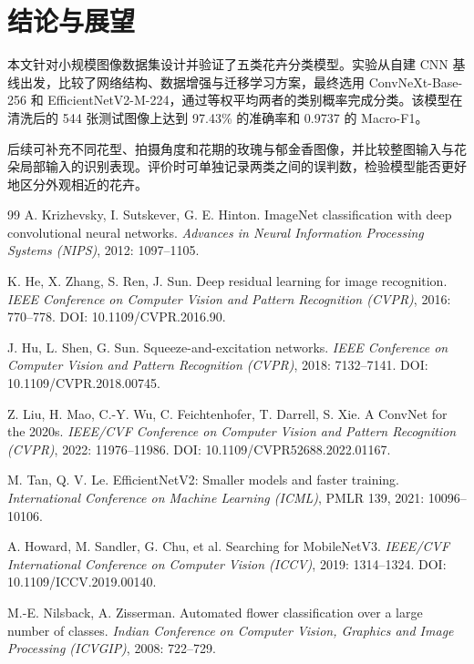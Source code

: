 \documentclass[11pt,a4paper,UTF8,fontset=windows]{ctexart}
\begin{document}
\section{结论与展望}

本文针对小规模图像数据集设计并验证了五类花卉分类模型。实验从自建 CNN 基线出发，比较了网络结构、数据增强与迁移学习方案，最终选用 ConvNeXt-Base-256 和 EfficientNetV2-M-224，通过等权平均两者的类别概率完成分类。该模型在清洗后的 544 张测试图像上达到 97.43\% 的准确率和 0.9737 的 Macro-F1。

后续可补充不同花型、拍摄角度和花期的玫瑰与郁金香图像，并比较整图输入与花朵局部输入的识别表现。评价时可单独记录两类之间的误判数，检验模型能否更好地区分外观相近的花卉。

\begin{thebibliography}{99}
\small
{}
A. Krizhevsky, I. Sutskever, G. E. Hinton.
ImageNet classification with deep convolutional neural networks.
\textit{Advances in Neural Information Processing Systems (NIPS)}, 2012: 1097--1105.

K. He, X. Zhang, S. Ren, J. Sun.
Deep residual learning for image recognition.
\textit{IEEE Conference on Computer Vision and Pattern Recognition (CVPR)}, 2016: 770--778.
DOI: 10.1109/CVPR.2016.90.

J. Hu, L. Shen, G. Sun.
Squeeze-and-excitation networks.
\textit{IEEE Conference on Computer Vision and Pattern Recognition (CVPR)}, 2018: 7132--7141.
DOI: 10.1109/CVPR.2018.00745.

Z. Liu, H. Mao, C.-Y. Wu, C. Feichtenhofer, T. Darrell, S. Xie.
A ConvNet for the 2020s.
\textit{IEEE/CVF Conference on Computer Vision and Pattern Recognition (CVPR)}, 2022: 11976--11986.
DOI: 10.1109/CVPR52688.2022.01167.

M. Tan, Q. V. Le.
EfficientNetV2: Smaller models and faster training.
\textit{International Conference on Machine Learning (ICML)}, PMLR 139, 2021: 10096--10106.

A. Howard, M. Sandler, G. Chu, et al.
Searching for MobileNetV3.
\textit{IEEE/CVF International Conference on Computer Vision (ICCV)}, 2019: 1314--1324.
DOI: 10.1109/ICCV.2019.00140.

M.-E. Nilsback, A. Zisserman.
Automated flower classification over a large number of classes.
\textit{Indian Conference on Computer Vision, Graphics and Image Processing (ICVGIP)}, 2008: 722--729.


\end{thebibliography}
\end{document}
